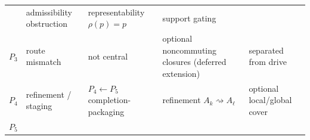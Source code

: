\documentclass[11pt]{article}
\theoremstyle{definition}
\begin{document}
\begin{longtable}[]{@{}lllll@{}}
\begin{minipage}[t]{0.17\columnwidth}
\end{minipage} & \begin{minipage}[t]{0.19\columnwidth}\raggedright
admissibility obstruction\strut
\end{minipage} & \begin{minipage}[t]{0.23\columnwidth}\raggedright
representability \(\rho(p)=p\)\strut
\end{minipage} & \begin{minipage}[t]{0.17\columnwidth}\raggedright
support gating\strut
\end{minipage}\tabularnewline
\begin{minipage}[t]{0.10\columnwidth}\raggedright
\(P_{3}\)\strut
\end{minipage} & \begin{minipage}[t]{0.17\columnwidth}\raggedright
route mismatch\strut
\end{minipage} & \begin{minipage}[t]{0.19\columnwidth}\raggedright
not central\strut
\end{minipage} & \begin{minipage}[t]{0.23\columnwidth}\raggedright
optional noncommuting closures (deferred extension)\strut
\end{minipage} & \begin{minipage}[t]{0.17\columnwidth}\raggedright
separated from drive\strut
\end{minipage}\tabularnewline
\begin{minipage}[t]{0.10\columnwidth}\raggedright
\(P_{4}\)\strut
\end{minipage} & \begin{minipage}[t]{0.17\columnwidth}\raggedright
refinement / staging\strut
\end{minipage} & \begin{minipage}[t]{0.19\columnwidth}\raggedright
\(P_{4}\!\leftarrow\!P_{5}\) completion-packaging\strut
\end{minipage} & \begin{minipage}[t]{0.23\columnwidth}\raggedright
refinement \(A_{k}\rightsquigarrow A_{\ell}\)\strut
\end{minipage} & \begin{minipage}[t]{0.17\columnwidth}\raggedright
optional local/global cover\strut
\end{minipage}\tabularnewline
\begin{minipage}[t]{0.10\columnwidth}\raggedright
\(P_{5}\)\strut
\end{minipage} & \begin{minipage}[t]{0.17\columnwidth}\raggedright

\end{minipage}
\end{longtable}
\end{document}
